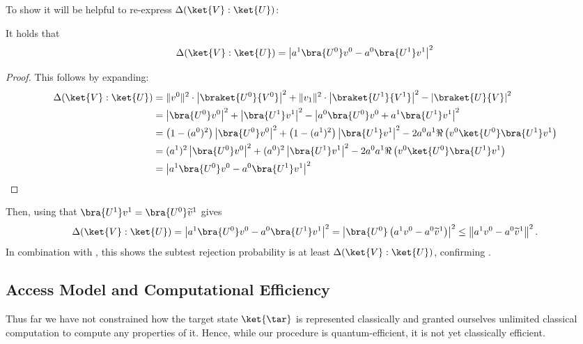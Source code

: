     To show  it will be helpful to re-express $\Delta(\ket{V} : \ket{U})$:
    \begin{proposition}
        It holds that
        \[
            \Delta(\ket{V} : \ket{U}) = \left|a^1 \bra{U^0}v^0 - a^0 \bra{U^1}v^1\right|^2
        \]
    \end{proposition}
    \begin{proof}
        This follows by expanding:
        \begin{align*}
            \Delta(\ket{V} : \ket{U}) &= \|v^0\|^2 \cdot \left|\braket{U^0}{V^0}\right|^2 + \|v_1\|^2 \cdot \left|\braket{U^1}{V^1}\right|^2  
            - \left|\braket{U}{V}\right|^2 \\
            &= \left|\bra{U^0}v^0\right|^2 + \left|\bra{U^1}v^1\right|^2 - \left|a^0 \bra{U^0}v^0 + a^1 \bra{U^1}v^1\right|^2 \\
            &= \left( 1- (a^0)^2 \right) \left|\bra{U^0}v^0\right|^2 + \left( 1- (a^1)^2 \right) \left|\bra{U^1}v^1\right|^2 - 2a^0a^1\Re \left( v^0\ket{U^0}\bra{U^1}v^1 \right) \\
            &= (a^1)^2\left|\bra{U^0}v^0\right|^2 + (a^0)^2 \left|\bra{U^1}v^1\right|^2 - 2a^0a^1\Re \left( v^0\ket{U^0}\bra{U^1}v^1 \right) \\
            &=\left|a^1 \bra{U^0}v^0 - a^0 \bra{U^1}v^1\right|^2 \qedhere
        \end{align*}
    \end{proof}
    Then, using that $\bra{U^1}v^1 = \bra{U^0}\widetilde{v}^1$ gives
    \[
        \Delta(\ket{V} : \ket{U}) = \left|a^1 \bra{U^0}v^0 - a^0 \bra{U^1}v^1\right|^2 = \left|\bra{U^0}\left(a^1 v^0-a^0 \widetilde{v}^1\right)\right|^2 \leq \left\|a^1 v^0 - a^0 \widetilde{v}^1\right\|^2.
    \]
    In combination with , this shows the subtest rejection probability is at least $\Delta(\ket{V} : \ket{U})$, confirming .




\subsection{Access Model and Computational Efficiency}\label{sec:access model}
Thus far we have not constrained how the target state $\ket{\tar}$ is represented classically and granted ourselves unlimited classical computation to compute any properties of it. Hence, while our procedure is quantum-efficient, it is not yet classically efficient.

